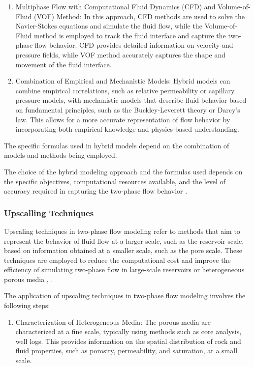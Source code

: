 {\begin{enumerate}
			\item Multiphase Flow with Computational Fluid Dynamics (CFD) and Volume-of-Fluid (VOF) Method: In this approach, CFD methods are used to solve the Navier-Stokes equations and simulate the fluid flow, while the Volume-of-Fluid method is employed to track the fluid interface and capture the two-phase flow behavior. CFD provides detailed information on velocity and pressure fields, while VOF method accurately captures the shape and movement of the fluid interface.
			
			\item Combination of Empirical and Mechanistic Models: Hybrid models can combine empirical correlations, such as relative permeability or capillary pressure models, with mechanistic models that describe fluid behavior based on fundamental principles, such as the Buckley-Leverett theory or Darcy's law. This allows for a more accurate representation of flow behavior by incorporating both empirical knowledge and physics-based understanding.
		\end{enumerate}
		
		The specific formulas used in hybrid models depend on the combination of models and methods being employed. 

		The choice of the hybrid modeling approach and the formulas used depends on the specific objectives, computational resources available, and the level of accuracy required in capturing the two-phase flow behavior \cite{tropea2007springer}.

	\subsubsection{Upscalling Techniques}
	
		Upscaling techniques in two-phase flow modeling refer to methods that aim to represent the behavior of fluid flow at a larger scale, such as the reservoir scale, based on information obtained at a smaller scale, such as the pore scale. These techniques are employed to reduce the computational cost and improve the efficiency of simulating two-phase flow in large-scale reservoirs or heterogeneous porous media \cite{gong2021dynamic}, \cite{valvatne2004predictive}.

		The application of upscaling techniques in two-phase flow modeling involves the following steps:

		\begin{enumerate}
			\item Characterization of Heterogeneous Media:	The porous media are characterized at a fine scale, typically using methods such as core analysis, well logs. This provides information on the spatial distribution of rock and fluid properties, such as porosity, permeability, and saturation, at a small scale.


\end{enumerate}}

